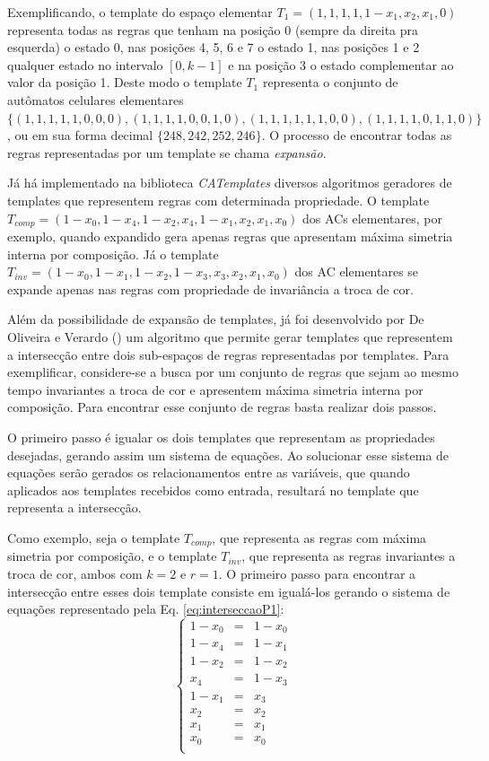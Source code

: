 \documentclass[12pt, a4paper]{article}
\begin{document}
Exemplificando, o template do espaço elementar $T_1 = (1,1,1,1,1-x_1,x_2,x_1,0)$ representa todas as regras que tenham na posição 0 (sempre da direita pra esquerda) o estado 0, nas posições 4, 5, 6 e 7 o estado 1, nas posições 1 e 2 qualquer estado no intervalo $[0,k-1]$ e na posição 3 o estado complementar ao valor da posição 1. Deste modo o template $T_1$ representa o conjunto de autômatos celulares elementares $\{(1,1,1,1,1,0,0,0),(1,1,1,1,0,0,1,0),(1,1,1,1,1,1,0,0),(1,1,1,1,0,1,1,0)\}$, ou em sua forma decimal $\{248,242,252,246\}$. O processo de encontrar todas as regras representadas por um template se chama \textit{expansão}.

Já há implementado na biblioteca \textit{CATemplates} \cite{CATemplates} diversos algoritmos geradores de templates que representem regras com determinada propriedade. O template $T_{comp} = (1 - x_0, 1 - x_4, 1 - x_2, x_4, 1 - x_1, x_2, x_1, x_0)$ dos ACs elementares, por exemplo, quando expandido gera apenas regras que apresentam máxima simetria interna por composição. Já o template $T_{inv} = (1 - x_0, 1 - x_1, 1 - x_2, 1 - x_3, x_3, x_2, x_1, x_0)$ dos AC elementares se expande apenas nas regras com propriedade de invariância a troca de cor.

Além da possibilidade de expansão de templates, já foi desenvolvido por De Oliveira e Verardo (\citeyear{deOliveira2014b}) um algoritmo que permite gerar templates que representem a intersecção entre dois sub-espaços de regras representadas por templates. Para exemplificar, considere-se a busca por um conjunto de regras que sejam ao mesmo tempo invariantes a troca de cor e apresentem máxima simetria interna por composição. Para encontrar esse conjunto de regras basta realizar dois passos.

O primeiro passo é igualar os dois templates que representam as propriedades desejadas, gerando assim um sistema de equações. Ao solucionar esse sistema de equações serão gerados os relacionamentos entre as variáveis, que quando aplicados aos templates recebidos como entrada, resultará no template que representa a intersecção.

Como exemplo, seja o template $T_{comp}$, que representa as regras com máxima simetria por composição, e o template $T_{inv}$, que representa as regras invariantes a troca de cor, ambos com $k=2$ e $r=1$. O primeiro passo para encontrar a intersecção entre esses dois template consiste em igualá-los gerando o sistema de equações representado pela Eq. \ref{eq:interseccaoP1}:
\begin{equation}
\left\{\begin{matrix}
1 - x_0	& = & 1 - x_0	\\
1 - x_4	& = & 1 - x_1	\\
1 - x_2	& = & 1 - x_2	\\
x_4		& = & 1 - x_3	\\
1 - x_1	& = & x_3		\\
x_2		& = & x_2		\\
x_1		& = & x_1		\\
x_0		& = & x_0		\\
\end{matrix}\right.
\label{eq:interseccaoP1}
\end{equation}
\end{document}
